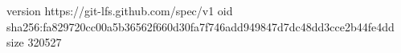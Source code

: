 version https://git-lfs.github.com/spec/v1
oid sha256:fa829720cc00a5b36562f660d30fa7f746add949847d7dc48dd3cce2b44fe4dd
size 320527
